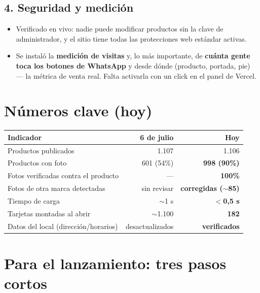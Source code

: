 \documentclass[a4paper,11pt]{article}
\begin{document}
\subsection*{4. Seguridad y medici\'on}
\begin{itemize}[leftmargin=1.2em, itemsep=2pt]
  \item Verificado en vivo: nadie puede modificar productos sin la clave de administrador,
        y el sitio tiene todas las protecciones web est\'andar activas.
  \item Se instal\'o la \textbf{medici\'on de visitas} y, lo m\'as importante, de
        \textbf{cu\'anta gente toca los botones de WhatsApp} y desde d\'onde
        (producto, portada, pie) --- la m\'etrica de venta real. Falta activarla con un
        click en el panel de Vercel.
\end{itemize}

\section{N\'umeros clave (hoy)}

\begin{table}[h]
\centering
\begin{tabular}{lrr}
\toprule
\textbf{Indicador} & \textbf{6 de julio} & \textbf{Hoy} \\
\midrule
Productos publicados & 1.107 & 1.106 \\
Productos con foto & 601 (54\%) & \textbf{998 (90\%)} \\
Fotos verificadas contra el producto & --- & \textbf{100\%} \\
Fotos de otra marca detectadas & sin revisar & \textbf{corregidas ($\sim$85)} \\
Tiempo de carga & $\sim$1 s & \textbf{$<$0,5 s} \\
Tarjetas montadas al abrir & $\sim$1.100 & \textbf{182} \\
Datos del local (direcci\'on/horarios) & desactualizados & \textbf{verificados} \\
\bottomrule
\end{tabular}
\end{table}

\section{Para el lanzamiento: tres pasos cortos}
\end{document}
